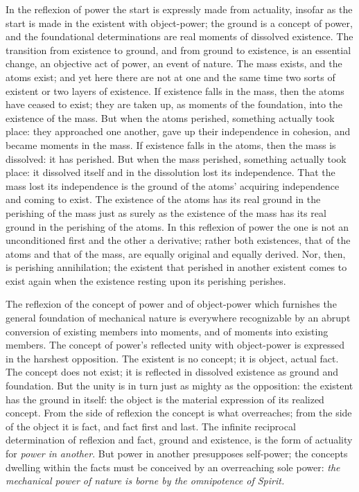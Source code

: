 \documentclass[12pt,a4paper]{book}
\begin{document}
In the reflexion of power the start is expressly made from actuality, insofar as the
start is made in the existent with object-power; the ground is a concept of power, and
the foundational determinations are real moments of dissolved existence. The
transition from existence to ground, and from ground to existence, is an essential
change, an objective act of power, an event of nature. The mass exists, and the atoms
exist; and yet here there are not at one and the same time two sorts of existent or
two layers of existence. If existence falls in the mass, then the atoms have ceased to
exist; they are taken up, as moments of the foundation, into the existence of the
mass. But when the atoms perished, something actually took place: they approached one
another, gave up their independence in cohesion, and became moments in the mass. If
existence falls in the atoms, then the mass is dissolved: it has perished. But when
the mass perished, something actually took place: it dissolved itself and in the
dissolution lost its independence. That the mass lost its independence is the ground
of the atoms' acquiring independence and coming to exist. The existence of the atoms
has its real ground in the perishing of the mass just as surely as the existence of
the mass has its real ground in the perishing of the atoms. In this reflexion of power
the one is not an unconditioned first and the other a derivative; rather both
existences, that of the atoms and that of the mass, are equally original and equally
derived. Nor, then, is perishing annihilation; the existent that perished in another
existent comes to exist again when the existence resting upon its perishing perishes.

The reflexion of the concept of power and of object-power which furnishes the general
foundation of mechanical nature is everywhere recognizable by an abrupt conversion of
existing members into moments, and of moments into existing members. The concept of
power's
reflected unity with object-power is expressed in the harshest opposition. The
existent is no concept; it is object, actual fact. The concept does not exist; it is
reflected in dissolved existence as ground and foundation. But the unity is in turn
just as mighty as the opposition: the existent has the ground in itself: the object is
the material expression of its realized concept. From the side of reflexion the
concept is what overreaches; from the side of the object it is fact, and fact first and
last. The infinite reciprocal determination of reflexion and fact, ground and
existence, is the form of actuality for \emph{power in another}. But power in another
presupposes self-power; the concepts dwelling within the facts must be conceived by an
overreaching sole power: \emph{the mechanical power of nature is borne by the
omnipotence of Spirit.}
\end{document}
